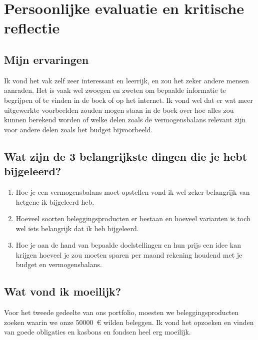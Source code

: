 \chapter{Persoonlijke evaluatie en kritische reflectie}
\label{persoonlijkeevaluatie}
\thispagestyle{chapternohead}


\section{Mijn ervaringen}

Ik vond het vak zelf zeer interessant en leerrijk, en zou het zeker andere mensen aanraden. Het is vaak wel zwoegen en zweten om bepaalde informatie te begrijpen of te vinden in de boek of op het internet. Ik vond wel dat er wat meer uitgewerkte voorbeelden zouden mogen staan in de boek over hoe alles zou kunnen berekend worden of welke delen zoals de vermogensbalans relevant zijn voor andere delen zoals het budget bijvoorbeeld.


\section{Wat zijn de 3 belangrijkste dingen die je hebt bijgeleerd?}
\begin{enumerate}
	\item Hoe je een vermogensbalans moet opstellen vond ik wel zeker belangrijk van hetgene ik bijgeleerd heb.
	\item Hoeveel soorten beleggingsproducten er bestaan en hoeveel varianten is toch wel iets belangrijk dat ik heb bijgeleerd.
	\item Hoe je aan de hand van bepaalde doelstellingen en hun prijs een idee kan krijgen hoeveel je zou moeten sparen per maand rekening houdend met je budget en vermogensbalans.
\end{enumerate}

\section{Wat vond ik moeilijk?}
Voor het tweede gedeelte van ons portfolio, moesten we beleggingsproducten zoeken waarin we onze 50000~\euro{} wilden beleggen. Ik vond het opzoeken en vinden van goede obligaties en kasbons en fondsen heel erg moeilijk.

